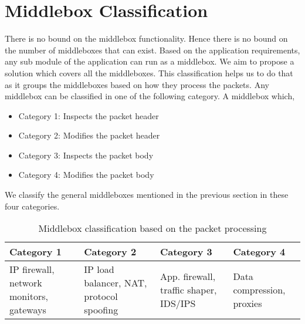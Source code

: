 \documentclass[a4paper,11pt]{report}
\begin{document}
\section{Middlebox Classification}
There is no bound on the middlebox functionality. Hence there is no bound on the number of middleboxes that can exist. Based on the application requirements, any sub module of the application can run as a middlebox. We aim to propose a solution which covers all the middleboxes. This classification helps us to do that as it groups the middleboxes based on how they process the packets. Any middlebox can be classified in one of the following category. A middlebox which,
\begin{itemize}
\item Category 1: Inspects the packet header
\item Category 2: Modifies the packet header
\item Category 3: Inspects the packet body
\item Category 4: Modifies the packet body
\end{itemize}  
We classify the general middleboxes mentioned in the previous section in these four categories.
\begin{table}[H]
\centering
\begin{tabular}{ | C{3.58cm} | C{3.58cm} | C{3.58cm} | C{3.58cm} | }
\hline
{\textbf {Category 1}} & {\textbf {Category 2}} & {\textbf {Category 3}} & {\textbf {Category 4}}\\ %
\hline
\hline
{IP firewall, network monitors, gateways} & {IP load balancer, NAT, protocol spoofing} & {App. firewall, traffic shaper, IDS/IPS} & {Data compression, proxies}\\ %
\hline
\end{tabular}
\caption{Middlebox classification based on the packet processing}
\end{table} 
\end{document}
